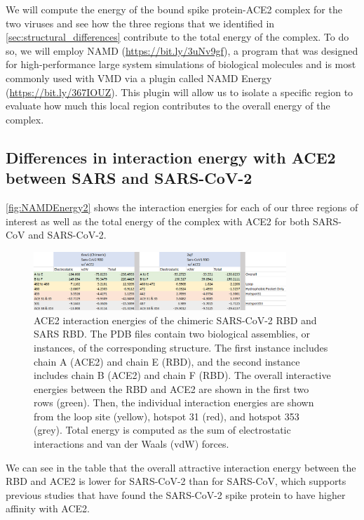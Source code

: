 We will compute the energy of the bound spike protein-ACE2 complex for the two viruses and see how the three regions that we identified in \autoref{sec:structural_differences} contribute to the total energy of the complex. To do so, we will employ NAMD (\url{https://bit.ly/3uNv9gf}), a program that was designed for high-performance large system simulations of biological molecules and is most commonly used with VMD via a plugin called NAMD Energy (\url{https://bit.ly/367IOUZ}). This plugin will allow us to isolate a specific region to evaluate how much this local region contributes to the overall energy of the complex. 

\FloatBarrier
{}
\subsection{Differences in interaction energy with ACE2 between SARS and SARS-CoV-2}

\autoref{fig:NAMDEnergy2} shows the interaction energies for each of our three regions of interest as well as the total energy of the complex with ACE2 for both SARS-CoV and SARS-CoV-2.

\begin{figure}[h]
	\centering
	\mySfFamily
	\includegraphics[width = 0.85\textwidth]{../images/NAMDEnergy2.png}
	\caption{ACE2 interaction energies of the chimeric SARS-CoV-2 RBD and SARS RBD. The PDB files contain two biological assemblies, or instances, of the corresponding structure. The first instance includes chain A (ACE2) and chain E (RBD), and the second instance includes chain B (ACE2) and chain F (RBD). The overall interactive energies between the RBD and ACE2 are shown in the first two rows (green). Then, the individual interaction energies are shown from the loop site (yellow), hotspot 31 (red), and hotspot 353 (grey). Total energy is computed as the sum of electrostatic interactions and van der Waals (vdW) forces.}
	\label{fig:NAMDEnergy2}
\end{figure}

We can see in the table that the overall attractive interaction energy between the RBD and ACE2 is lower for SARS-CoV-2 than for SARS-CoV, which supports previous studies that have found the SARS-CoV-2 spike protein to have higher affinity with ACE2.

